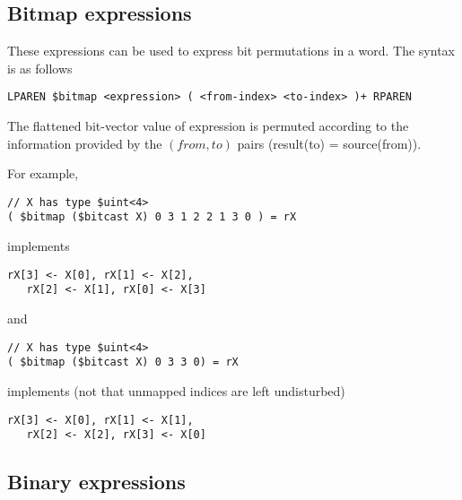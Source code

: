 \documentclass{article}
\begin{document}
\subsection{Bitmap expressions}

These expressions can be used to express bit permutations
in a word.  The syntax is as follows
\begin{verbatim}
LPAREN $bitmap <expression> ( <from-index> <to-index> )+ RPAREN
\end{verbatim}
The flattened bit-vector value of expression is permuted according
to the information provided by the $(from,to)$ pairs (result(to) = source(from)).

For example, 
\begin{verbatim}
// X has type $uint<4>
( $bitmap ($bitcast X) 0 3 1 2 2 1 3 0 ) = rX
\end{verbatim}
implements
\begin{verbatim}
rX[3] <- X[0], rX[1] <- X[2], 
   rX[2] <- X[1], rX[0] <- X[3]
\end{verbatim}
and
\begin{verbatim}
// X has type $uint<4>
( $bitmap ($bitcast X) 0 3 3 0) = rX
\end{verbatim}
implements (not that unmapped indices
are left undisturbed)
\begin{verbatim}
rX[3] <- X[0], rX[1] <- X[1], 
   rX[2] <- X[2], rX[3] <- X[0]
\end{verbatim}



\subsection{Binary expressions}
\end{document}
